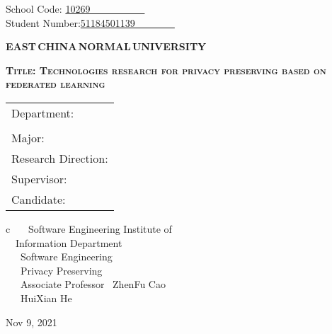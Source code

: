 \newpage

\pagestyle{empty}

\hskip 1.4cm {School Code: \underline{10269~~~~~~~~~~~\qquad}}\\
\hspace*{\fill} {Student Number:\underline{51184501139~~~~~~~~}}
\vskip 2cm

\begin{center}
{\Huge \bf EAST\,CHINA\,NORMAL\,UNIVERSITY}
\end{center}

\vskip 3cm

\begin{center}
{\huge \bf \scshape Title: Technologies research for privacy preserving based on federated learning}
\end{center}

\vskip 2cm {\large
\begin{center}
\begin{tabular}{l}
Department:\\
			\\
Major:\\
Research Direction:\\
Supervisor:\\
Candidate:
\end{tabular}
\begin{tabular}c
~~~Software Engineering Institute of\\
\hline ~~Information Department  \\
\hline ~~~Software Engineering  \\
\hline ~~~Privacy Preserving\\
\hline ~~~Associate Professor ~ZhenFu Cao~  \\
\hline ~~~HuiXian He  \\
\hline
\end{tabular}
\end{center}}

\vskip 30mm

\begin{center}
{\Large Nov 9, 2021}
\end{center}
